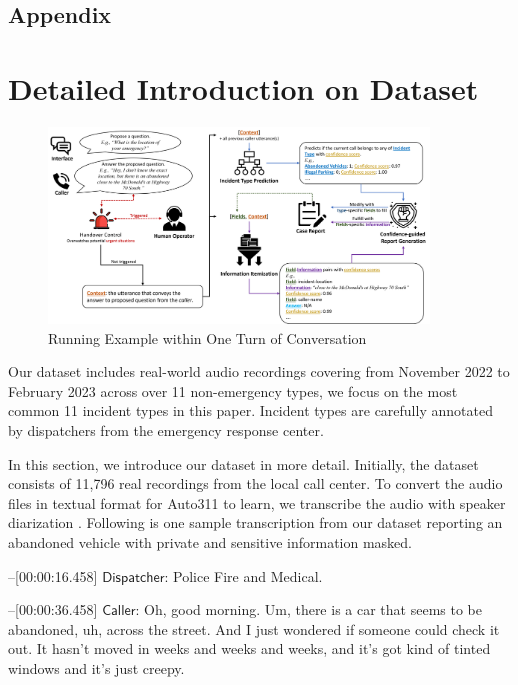 \appendix
\begin{center}
\section*{Appendix}
\end{center}

\section{Detailed Introduction on Dataset}

\begin{figure}[htbp]
    \centering
    \includegraphics[width=0.9\textwidth]{figures/running_example.png}
    \caption{Running Example within One Turn of Conversation}
    \label{fig:running_example}
    \vspace{-0.5cm}
\end{figure}

Our dataset includes real-world audio recordings covering from November 2022 to February 2023 across over 11 non-emergency types, we focus on the most common 11 incident types in this paper. Incident types are carefully annotated by dispatchers from the emergency response center.

In this section, we introduce our dataset in more detail. Initially, the dataset consists of 11,796 real recordings from the local call center. To convert the audio files in textual format for Auto311 to learn, we transcribe the audio with speaker diarization \cite{openai_whisper_2022, Bredin_pyannote_2020}. Following is one sample transcription from our dataset reporting an abandoned vehicle with private and sensitive information masked.

\noindent[00:00:13.727]--[00:00:16.458] $\mathsf{Dispatcher}$: Police Fire and Medical. 

\noindent[00:00:17.121]--[00:00:36.458] $\mathsf{Caller}$: Oh, good morning. Um, there is a car that seems to be abandoned, uh, across the street. And I just wondered if someone could check it out. It hasn't moved in weeks and weeks and weeks, and it's got kind of tinted windows and it's just creepy.


